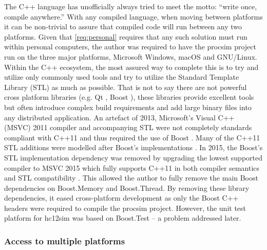 The C++ language has unofficially always tried to meet the motto: ``write once, compile anywhere.'' With any compiled language, when moving between platforms it can be non-trivial to assure that compiled code will run between any two platforms. Given that \cref{req:personal} requires that any such solution must run within personal computers, the author was required to have the procsim project run on the three major platforms, Microsoft Windows, macOS and GNU/Linux. Within the C++ ecosystem, the most assured way to complete this is to try and utilize only commonly used tools and try to utilize the Standard Template Library (STL) as much as possible. That is not to say there are not powerful cross platform libraries (e.g. Qt \cite{Qt}, Boost \cite{Boost}), these libraries provide excellent tools but often introduce complex build requirements and add large binary files into any distributed application. An artefact of 2013, Microsoft's Visual C++ (MSVC) 2011 compiler and accompanying STL were not completely standards compliant with C++11 and thus \cite{Brightwell2013} required the use of Boost \cite{Microsoft:MSVC:ModernCPP:2011}. Many of the C++11 STL additions were modelled after Boost's implementations \cite{Meyers2005}. In 2015, the Boost's STL implementation dependency was removed by upgrading the lowest supported compiler to MSVC 2015 which fully supports C++11 in both compiler semantics and STL compatibility \cite{Microsoft:MSVC:ModernCPP}. This allowed the author to fully remove the main Boost dependencies on Boost.Memory and Boost.Thread. By removing these library dependencies, it eased cross-platform development as only the Boost C++ headers were required to compile the procsim project. However, the unit test platform for hc12sim was based on Boost.Test \cite{Boost1.53.0:Test} -- a problem addressed later.

\subsubsection{Access to multiple platforms}

